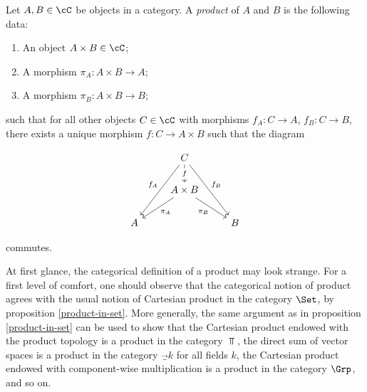 \begin{defn}[Product]\label{product-definition} Let $A,B\in \cC$ be objects in a category. A {\em product} of $A$ and $B$ is the following data:

\begin{enumerate}
\item An object $A\times B\in \cC$;
\item A morphism $\pi_A:A\times B\to A$;
\item A morphism $\pi_B:A\times B\to B$;
\end{enumerate}

such that for all other objects $C\in \cC$ with morphisms $f_A:C\to A$, $f_B:C\to B$, there exists a unique morphism $f:C\to A\times B$ such that the diagram

\[\begin{tikzcd}
	& C \\
	& {A\times B} \\
	A && B
	\arrow["f"{description}, from=1-2, to=2-2]
	\arrow["{f_A}"', from=1-2, to=3-1]
	\arrow["{f_B}", from=1-2, to=3-3]
	\arrow["{\pi_A}", from=2-2, to=3-1]
	\arrow["{\pi_B}"', from=2-2, to=3-3]
\end{tikzcd}\]

commutes.


\end{defn}

\begin{rem}\label{product-examples-remark} At first glance, the categorical definition of a product may look strange. For a first level of comfort, one should observe that the categorical notion of product agrees with the usual notion of Cartesian product in the category $\Set$, by proposition \ref{product-in-set}. More generally, the same argument as in proposition \ref{product-in-set} can be used to show that the Cartesian product endowed with the product topology is a product in the category $\Top$, the direct sum of vector spaces is a product in the category $\Vec_k$ for all fields $k$,  the Cartesian product endowed with component-wise multiplication is a product in the category $\Grp$, and so on.
\end{rem}

